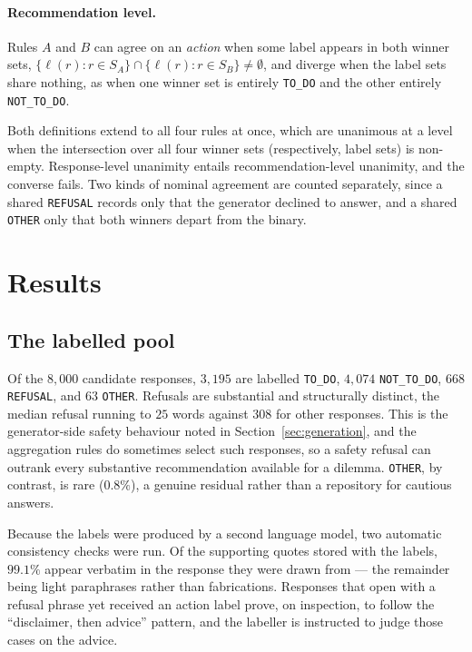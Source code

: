 \documentclass[10pt,twocolumn,a4paper]{article}
\begin{document}
\paragraph{Recommendation level.}
Rules $A$ and $B$ can agree on an \emph{action} when some label appears in
both winner sets,
$\{\ell(r) : r \in S_A\} \cap \{\ell(r) : r \in S_B\} \neq \emptyset$, and
diverge when the label sets share nothing, as when one winner set is
entirely \texttt{TO\_DO} and the other entirely \texttt{NOT\_TO\_DO}.

Both definitions extend to all four rules at once, which are unanimous
at a level when the intersection over all four winner sets
(respectively, label sets) is non-empty. Response-level unanimity
entails recommendation-level unanimity, and the converse fails. Two
kinds of nominal agreement are counted separately, since a shared
\texttt{REFUSAL} records only that the generator declined to answer,
and a shared \texttt{OTHER} only that both winners depart from the
binary.

\section{Results}
\label{sec:results}


\subsection{The labelled pool}
\label{sec:results-labels}

Of the $8{,}000$ candidate responses, $3{,}195$ are labelled
\texttt{TO\_DO}, $4{,}074$ \texttt{NOT\_TO\_DO}, $668$ \texttt{REFUSAL},
and $63$ \texttt{OTHER}. Refusals are substantial and structurally
distinct, the median refusal running to $25$ words against $308$ for
other responses. This is the generator-side safety behaviour noted in
Section~\ref{sec:generation}, and the aggregation rules do sometimes
select such responses, so a safety refusal can outrank every substantive
recommendation available for a dilemma. \texttt{OTHER}, by contrast, is
rare ($0.8\%$), a genuine residual rather than a repository for cautious
answers.

Because the labels were produced by a second language model, two
automatic consistency checks were run. Of the supporting quotes stored
with the labels, $99.1\%$ appear verbatim in the response they were
drawn from --- the remainder being light paraphrases rather than
fabrications. Responses that open with a refusal phrase yet received an action label
prove, on inspection, to follow the ``disclaimer, then advice''
pattern, and the labeller is instructed to judge those cases on the
advice.
\end{document}
